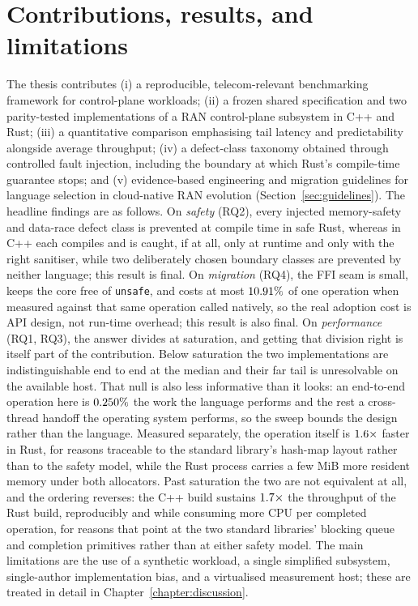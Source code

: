 \documentclass[english,twoside,openright,a4paper,censored,csm,software-track-2020]{HYthesisML}
\begin{document}
\section{Contributions, results, and limitations}
The thesis contributes (i) a reproducible, telecom-relevant benchmarking framework for
control-plane workloads; (ii) a frozen shared specification and two parity-tested
implementations of a RAN control-plane subsystem in C++ and Rust; (iii) a quantitative
comparison emphasising tail latency and predictability alongside average throughput;
(iv) a defect-class taxonomy obtained through controlled fault injection, including the
boundary at which Rust's compile-time guarantee stops; and (v) evidence-based engineering and
migration guidelines for language selection in cloud-native RAN evolution
(Section~\ref{sec:guidelines}). The headline findings are as follows. On \emph{safety} (RQ2),
every injected memory-safety and data-race defect class is prevented at compile time in safe
Rust, whereas in C++ each compiles and is caught, if at all, only at runtime and only with the
right sanitiser, while two deliberately chosen boundary classes are prevented by neither
language; this result is final. On \emph{migration} (RQ4), the FFI seam is small, keeps the core free of
\texttt{unsafe}, and costs at most $10.91\%$ of one operation when measured against
that same operation called natively, so the real adoption cost is API design, not run-time
overhead; this result is also final. On \emph{performance} (RQ1, RQ3), the answer divides at
saturation, and getting that division right is itself part of the contribution. Below saturation
the two implementations are indistinguishable end to end at the median and their far tail is
unresolvable on the available host. That null is also less informative than it looks: an end-to-end
operation here is $0.250\%$ the work the language performs and the rest a
cross-thread handoff the operating system performs, so the sweep bounds the design rather than the
language. Measured separately, the operation itself is $1.6\times$ faster in Rust, for
reasons traceable to the standard library's hash-map layout rather than to the safety model, while
the Rust process carries a few MiB more resident memory under both allocators. Past saturation the
two are not equivalent at all, and the ordering reverses: the C++ build sustains
$1.7\times$ the throughput of the Rust build, reproducibly and while consuming more
CPU per completed operation, for reasons that point at the two standard libraries' blocking queue
and completion primitives rather than at either safety model. The main limitations are the use of a
synthetic workload, a single simplified subsystem, single-author implementation bias, and a
virtualised measurement host; these are treated in detail in
Chapter~\ref{chapter:discussion}.
\end{document}
